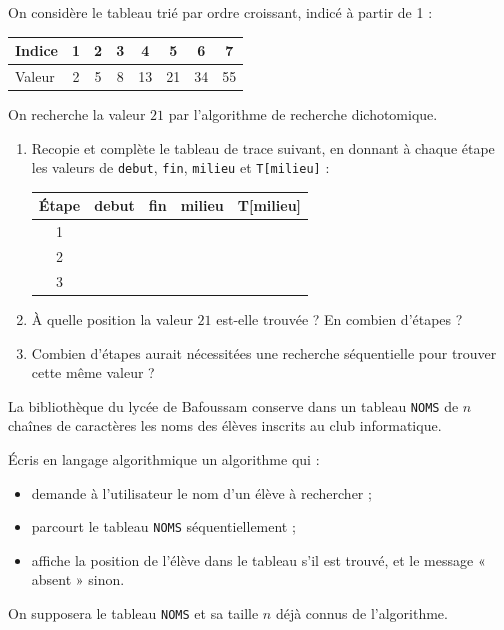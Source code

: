 \documentclass[11pt]{article}
\begin{document}
\begin{exercice}
On considère le tableau trié par ordre croissant, indicé à partir de 1 :
\begin{center}
\begin{tabular}{|l|c|c|c|c|c|c|c|}
\hline
\rowcolor{popblueL} Indice & 1 & 2 & 3 & 4 & 5 & 6 & 7 \\
\hline
Valeur & 2 & 5 & 8 & 13 & 21 & 34 & 55 \\
\hline
\end{tabular}
\end{center}
On recherche la valeur $21$ par l'algorithme de recherche dichotomique.
\begin{enumerate}
\item Recopie et complète le tableau de trace suivant, en donnant à chaque étape les valeurs de \texttt{debut}, \texttt{fin}, \texttt{milieu} et \texttt{T[milieu]} :
\begin{center}
\begin{tabular}{|c|c|c|c|c|}
\hline
\rowcolor{popblueL} Étape & debut & fin & milieu & T[milieu] \\
\hline
1 & & & & \\
\hline
2 & & & & \\
\hline
3 & & & & \\
\hline
\end{tabular}
\end{center}
\item À quelle position la valeur $21$ est-elle trouvée ? En combien d'étapes ?
\item Combien d'étapes aurait nécessitées une recherche séquentielle pour trouver cette même valeur ?
\end{enumerate}
\end{exercice}

\begin{exercice}
La bibliothèque du lycée de Bafoussam conserve dans un tableau \texttt{NOMS} de $n$ chaînes de caractères les noms des élèves inscrits au club informatique.

Écris en langage algorithmique un algorithme qui :
\begin{itemize}
\item demande à l'utilisateur le nom d'un élève à rechercher ;
\item parcourt le tableau \texttt{NOMS} séquentiellement ;
\item affiche la position de l'élève dans le tableau s'il est trouvé, et le message « absent » sinon.
\end{itemize}
On supposera le tableau \texttt{NOMS} et sa taille $n$ déjà connus de l'algorithme.
\end{exercice}
\end{document}

